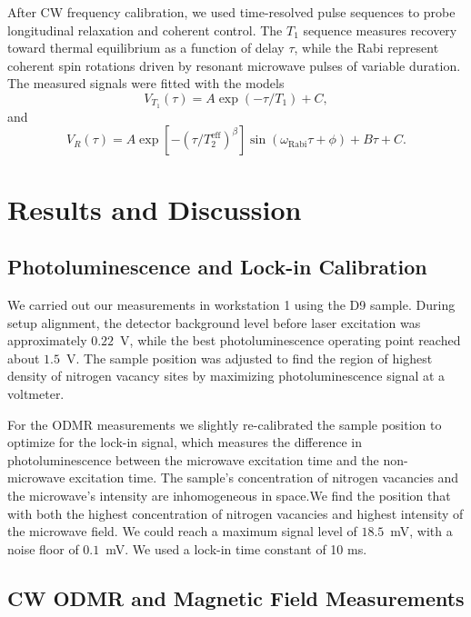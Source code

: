 \documentclass[aps,prb,reprint,amsmath,amssymb,floatfix]{revtex4-2}
\begin{document}
After CW frequency calibration, we used time-resolved pulse sequences to probe longitudinal relaxation and coherent control. The $T_1$ sequence measures recovery toward thermal equilibrium as a function of delay $\tau$, while the Rabi represent coherent spin rotations driven by resonant microwave pulses of variable duration. The measured signals were fitted with the models
\begin{equation}
V_{T_1}(\tau)=A\exp\left(-\tau/T_1\right)+C,
\end{equation}
and
\begin{equation}
V_R(\tau)=A\exp\left[-\left(\tau/T_2^{\mathrm{eff}}\right)^\beta\right]\sin\left(\omega_{\mathrm{Rabi}}\tau+\phi\right)+B\tau+C.
\end{equation}

\section{Results and Discussion}

\subsection{Photoluminescence and Lock-in Calibration}

We carried out our measurements in workstation 1 using the D9 sample.
During setup alignment, the detector background level before laser excitation was approximately $0.22$~V, while the best photoluminescence operating point reached about $1.5$~V. The sample position was adjusted to find the region of highest density of nitrogen vacancy sites by maximizing photoluminescence signal at a voltmeter.

For the ODMR measurements we slightly re-calibrated the sample position to optimize for the lock-in signal, which measures the difference in photoluminescence between the microwave excitation time and the non-microwave excitation time. The sample's concentration of nitrogen vacancies and the microwave's intensity are inhomogeneous in space.We find the position that with both the highest concentration of nitrogen vacancies and highest intensity of the microwave field. We could reach a maximum signal level of $18.5$~mV, with a noise floor of $0.1$~mV. We used a lock-in time constant of 10 ms.

\subsection{CW ODMR and Magnetic Field Measurements}
\end{document}

